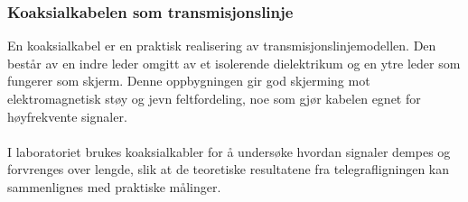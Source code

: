 \subsubsection{Koaksialkabelen som transmisjonslinje}
En koaksialkabel er en praktisk realisering av transmisjonslinjemodellen. Den består av en indre leder omgitt av et isolerende dielektrikum og en ytre leder som fungerer som skjerm. Denne oppbygningen gir god skjerming mot elektromagnetisk støy og jevn feltfordeling, noe som gjør kabelen egnet for høyfrekvente signaler. 
\\
\\I laboratoriet brukes koaksialkabler for å undersøke hvordan signaler dempes og forvrenges over lengde, slik at de teoretiske resultatene fra telegrafligningen kan sammenlignes med praktiske målinger.

\clearpage

